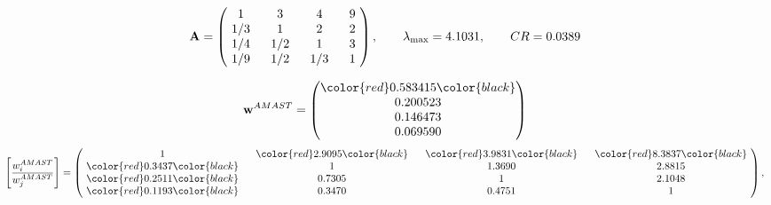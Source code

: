 \begin{example}
\begin{equation*}
\mathbf{A} =
\begin{pmatrix}
$\,\,$ 1 $\,\,$ & $\,\,$3$\,\,$ & $\,\,$4$\,\,$ & $\,\,$9 $\,\,$ \\
$\,\,$ 1/3$\,\,$ & $\,\,$ 1 $\,\,$ & $\,\,$2$\,\,$ & $\,\,$2 $\,\,$ \\
$\,\,$ 1/4$\,\,$ & $\,\,$ 1/2$\,\,$ & $\,\,$ 1 $\,\,$ & $\,\,$3 $\,\,$ \\
$\,\,$ 1/9$\,\,$ & $\,\,$ 1/2$\,\,$ & $\,\,$ 1/3$\,\,$ & $\,\,$ 1  $\,\,$ \\
\end{pmatrix},
\qquad
\lambda_{\max} =
4.1031,
\qquad
CR = 0.0389
\end{equation*}

\begin{equation*}
\mathbf{w}^{AMAST} =
\begin{pmatrix}
\color{red} 0.583415\color{black} \\
0.200523\\
0.146473\\
0.069590
\end{pmatrix}\end{equation*}
\begin{equation*}
\left[ \frac{{w}^{AMAST}_i}{{w}^{AMAST}_j} \right] =
\begin{pmatrix}
$\,\,$ 1 $\,\,$ & $\,\,$\color{red} 2.9095\color{black} $\,\,$ & $\,\,$\color{red} 3.9831\color{black} $\,\,$ & $\,\,$\color{red} 8.3837\color{black} $\,\,$ \\
$\,\,$\color{red} 0.3437\color{black} $\,\,$ & $\,\,$ 1 $\,\,$ & $\,\,$1.3690$\,\,$ & $\,\,$2.8815  $\,\,$ \\
$\,\,$\color{red} 0.2511\color{black} $\,\,$ & $\,\,$0.7305$\,\,$ & $\,\,$ 1 $\,\,$ & $\,\,$2.1048 $\,\,$ \\
$\,\,$\color{red} 0.1193\color{black} $\,\,$ & $\,\,$0.3470$\,\,$ & $\,\,$0.4751$\,\,$ & $\,\,$ 1  $\,\,$ \\
\end{pmatrix},
\end{equation*}


\end{example}
